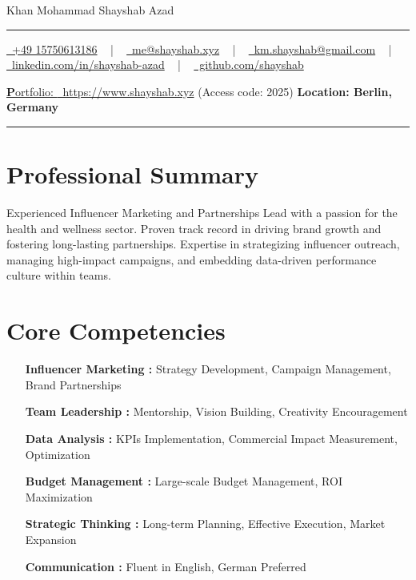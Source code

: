 \documentclass[letterpaper,10pt]{article}
\newcommand{\documentTitle}[2]{
  \begin{center}
    {\Huge\color{accentTitle} #1}
    \vspace{10pt}
    {\color{accentLine} \hrule}
    \vspace{2pt}
    \footnotesize{#2}
    \vspace{2pt}
    {\color{accentLine} \hrule}
  \end{center}
}
\begin{document}

  \documentTitle{Khan Mohammad Shayshab Azad}{
    \href{tel:+49 15750613186}{
      \raisebox{-0.05\height} \faPhone\ +49 15750613186} ~ | ~
      \href{mailto:km.shayshab@gmail.com}{
      \raisebox{-0.15\height} \faEnvelope\ me@shayshab.xyz} ~ | ~
    \href{mailto:me@shayshab.xyz}{
      \raisebox{-0.15\height} \faEnvelope\ km.shayshab@gmail.com} ~ | ~
    \href{https://linkedin.com/in/shayshab-azad/}{
      \raisebox{-0.15\height} \faLinkedin\ linkedin.com/in/shayshab-azad} ~ | ~
    \href { https://github.com/shayshab}{
      \raisebox{-0.15\height} \faGithub \ github.com/shayshab} 
     
      \href{https://www.shayshab.xyz/}{
      \raisebox{-0.15\height} {\textbf Portfolio: }\ https://www.shayshab.xyz}{ (Access code: 2025)}
    \textbf{ Location: Berlin, Germany}
  }

\section*{Professional Summary}
Experienced Influencer Marketing and Partnerships Lead with a passion for the health and wellness sector. Proven track record in driving brand growth and fostering long-lasting partnerships. Expertise in strategizing influencer outreach, managing high-impact campaigns, and embedding data-driven performance culture within teams.


   \section{Core Competencies}

  \begin{itemize}[itemsep=-2px, parsep=1pt, leftmargin=120 pt]
    \item[\textbf{Influencer Marketing :}] Strategy Development, Campaign Management, Brand Partnerships
    \item[\textbf{Team Leadership :}] Mentorship, Vision Building, Creativity Encouragement
    \item[\textbf{Data Analysis :}] KPIs Implementation, Commercial Impact Measurement, Optimization
    \item[\textbf{Budget Management :}] Large-scale Budget Management, ROI Maximization
    \item[\textbf{Strategic Thinking :}] Long-term Planning, Effective Execution, Market Expansion
    \item[\textbf{Communication :}] Fluent in English, German Preferred
  \end{itemize}
\end{document}
